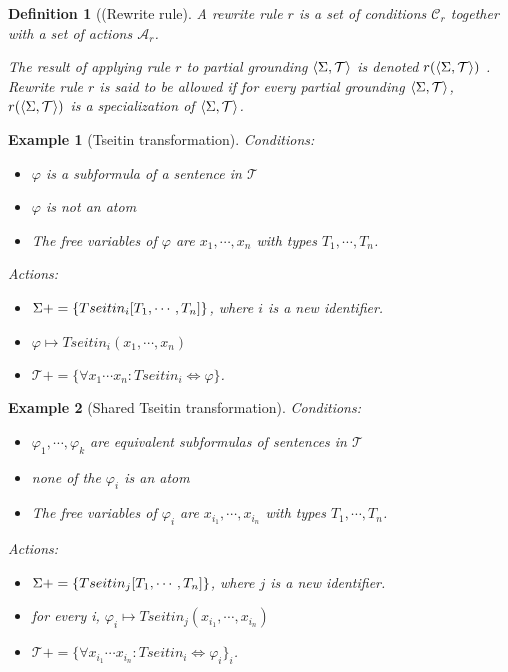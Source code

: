 \documentclass{article}
\newcommand{\C}{\mathcal{C}}
\newcommand{\A}{\mathcal{A}}
\newcommand{\seq}[1]{\left\langle#1\right\rangle}
\newcommand{\T}{\mathcal{T}}
\newcommand{\pg}{\seq{\voc,\T}}
\newtheorem{definition}{Definition}
\newtheorem{example}{Example}
\begin{document}
\begin{definition}[(Rewrite rule]
A rewrite rule $r$ is a set of conditions $\C_r$ together with a set of actions $\A_r$.

The result of applying rule $r$ to partial grounding $\pg$ is denoted $r(\pg)$ . Rewrite rule $r$ is said to be allowed if for every partial grounding $\pg$, $r(\pg)$ is a specialization of $\pg$.	 
\end{definition}

\begin{example}[Tseitin transformation]
Conditions:
\begin{itemize}
	\item $\varphi$ is a subformula of a sentence in $\T$
	\item $\varphi$ is not an atom
	\item The free variables of $\varphi$ are $x_1,\cdots,x_n$ with types $T_1,\cdots,T_n$.
\end{itemize}
Actions:
\begin{itemize}
	\item $\Sigma +=\{Tseitin_i[T_1,\cdots,T_n]\}$, where $i$ is a new identifier.
	\item $\varphi \mapsto Tseitin_i(x_1,\cdots,x_n)$
	\item $\T += \{\forall x_1\cdots x_n: Tseitin_i\Leftrightarrow \varphi\}$.
\end{itemize}
\end{example}

\begin{example}[Shared Tseitin transformation]
Conditions:
\begin{itemize}
	\item $\varphi_1,\cdots,\varphi_k$ are equivalent subformulas of sentences in $\T$
    \item none of the $\varphi_i$ is an atom
    \item The free variables of $\varphi_i$ are $x_{i_1},\cdots,x_{i_n}$ with types $T_1,\cdots,T_n$.
\end{itemize}
Actions:
\begin{itemize}
	\item $\Sigma +=\{Tseitin_j[T_1,\cdots,T_n]\}$, where $j$ is a new identifier.
	\item for every i, $\varphi_i \mapsto Tseitin_j(x_{i_1},\cdots,x_{i_n})$
	\item $\T += \{\forall x_{i_1}\cdots x_{i_n}: Tseitin_i\Leftrightarrow \varphi_i\}_i$.
\end{itemize}
\end{example}
\end{document}
